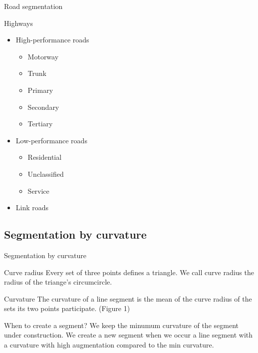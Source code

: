 \documentclass{beamer}
\begin{document}
\begin{frame}{Road segmentation}
  \begin{block}{Highways}
    \begin{itemize}
      \item High-performance roads
        \begin{itemize}
          \item Motorway
          \item Trunk
          \item Primary
          \item Secondary
          \item Tertiary
        \end{itemize}
      \item Low-performance roads
        \begin{itemize}
          \item Residential
          \item Unclassified
          \item Service
        \end{itemize}
      \item Link roads
    \end{itemize}
  \end{block}
\end{frame}

\subsection{Segmentation by curvature}

\begin{frame}{Segmentation by curvature}
  \begin{block}{Curve radius}
    Every set of three points defines a triangle. We call curve radius the radius of the triange's circumcircle.
  \end{block}

  \begin{block}{Curvature}
    The curvature of a line segment is the mean of the curve radius of the sets its two points participate. (Figure 1)
  \end{block}

  \begin{block}{When to create a segment?}
    We keep the minumum curvature of the segment under construction. We create a new segment when we occur a line segment with a curvature with high augmentation compared to the min curvature.
  \end{block}
\end{frame}
\end{document}
